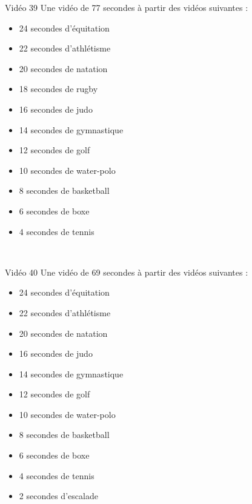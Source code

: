 \documentclass[10pt, a5paper,twoside]{article}
\begin{document}
\begin{card}[width = \textwidth, colback = olympicviolet, colframe = olympicviolet, bottomtitle = 2mm]{Vidéo 39}
  Une vidéo de 77 secondes à partir des vidéos suivantes :
  \vspace{-1mm}\begin{itemize}
    \item 24 secondes d'équitation
    \item 22 secondes d'athlétisme
    \item 20 secondes de natation
    \item 18 secondes de rugby
    \item 16 secondes de judo
    \item 14 secondes de gymnastique
    \item 12 secondes de golf
    \item 10 secondes de water-polo
    \item 8 secondes de basketball
    \item 6 secondes de boxe
    \item 4 secondes de tennis
  \end{itemize}
\end{card}

\vfill

\clearpage
~
\vfill

\begin{card}[width = \textwidth, colback = olympicviolet, colframe = olympicviolet, bottomtitle = 2mm]{Vidéo 40}
  Une vidéo de 69 secondes à partir des vidéos suivantes :
  \vspace{-1mm}\begin{itemize}
    \item 24 secondes d'équitation
    \item 22 secondes d'athlétisme
    \item 20 secondes de natation
    \item 16 secondes de judo
    \item 14 secondes de gymnastique
    \item 12 secondes de golf
    \item 10 secondes de water-polo
    \item 8 secondes de basketball
    \item 6 secondes de boxe
    \item 4 secondes de tennis
    \item 2 secondes d'escalade
  \end{itemize}
\end{card}

\vfill
\end{document}
